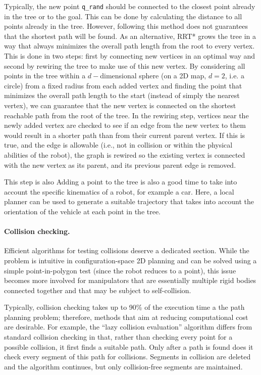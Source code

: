 Typically, the new point \texttt{q\_rand} should be connected to the closest point already in the tree or to the goal. This can be done by calculating the distance to all points already in the tree. However, following this method does not guarantees that the shortest path will be found.
As an alternative, RRT* grows the tree in a way that always minimizes the overall path length from the root to every vertex. This is done in two steps: first by connecting new vertices in an optimal way and second by rewiring the tree to make use of this new vertex. By considering all points in the tree within a $d-$dimensional sphere (on a 2D map, $d=2$, i.e. a circle) from a fixed radius from each added vertex and finding the point that minimizes the overall path length to the start (instead of simply the nearest vertex), we can guarantee that the new vertex is connected on the shortest reachable path from the root of the tree. In the rewiring step, vertices near the newly added vertex are checked to see if an edge from the new vertex to them would result in a shorter path than from their current parent vertex. If this is true, and the edge is allowable (i.e., not in collision or within the physical abilities of the robot), the graph is rewired so the existing vertex is connected with the new vertex as its parent, and its previous parent edge is removed.

This step is also Adding a point to the tree is also a good time to take into account the specific kinematics of a robot, for example a car. Here, a local planner can be used to generate a suitable trajectory that takes into account the orientation of the vehicle at each point in the tree.

\paragraph{Collision checking.}

Efficient algorithms for testing collisions deserve a dedicated section. While the problem is intuitive in configuration-space 2D planning and can be solved using a simple point-in-polygon test (since the robot reduces to a point), this issue becomes more involved for manipulators that are essentially multiple rigid bodies connected together and that may be subject to self-collision.

Typically, collision checking takes up to 90\% of the execution time a the path planning problem; therefore, methods that aim at reducing computational cost are desirable. For example, the ``lazy collision evaluation'' algorithm differs from standard collision checking in that, rather than checking every point for a possible collision, it first finds a suitable path. Only after a path is found does it check every segment of this path for collisions. Segments in collision are deleted and the algorithm continues, but only collision-free segments are maintained.

